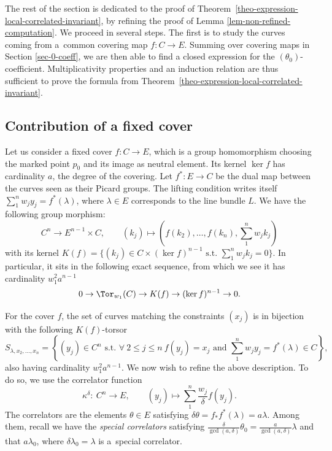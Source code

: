 The rest of the section is dedicated to the proof of Theorem~\ref{theo-expression-local-correlated-invariant}, by refining the proof of Lemma \ref{lem-non-refined-computation}. We proceed in several steps. The first is to study the curves coming from a~common covering map $f\colon C\to E$. Summing over covering maps in Section \ref{sec-0-coeff}, we are then able to find a closed expression for the $(\theta_0)$-coefficient. Multiplicativity properties and an induction relation are thus sufficient to prove the formula from Theorem~\ref{theo-expression-local-correlated-invariant}.

 \subsection{Contribution of a fixed cover}

 Let us consider a fixed cover $f\colon C\to E$, which is a group homomorphism choosing the marked point $p_0$ and its image as neutral element. Its kernel $\ker f$ has cardinality $a$, the degree of the covering. Let $f^*\colon E\to C$ be the dual map between the curves seen as their Picard groups. The lifting condition writes itself $\sum_1^n w_jy_j=f^*(\lambda)$, where $\lambda\in E$ corresponds to the line bundle $L$. We have the following group morphism:
 \[
 C^n \longrightarrow E^{n-1}\times C, \qquad
 (k_j) \longmapsto \left(f(k_2),\dots,f(k_n),\sum_1^n w_jk_j \right)
 \]
 with its kernel $K(f)=\big\{ (k_j)\in C\times(\ker f)^{n-1} \text{ s.t. } \sum_1^n w_jk_j=0 \big\}$. In particular, it sits in the following exact sequence, from which we see it has cardinality $w_1^2 a^{n-1}$
 \[ 0\to \Tor_{w_1}(C) \to K(f) \to (\ker f)^{n-1} \to 0. \]

 For the cover $f$, the set of curves matching the constraints $(x_j)$ is in bijection with the following $K(f)$-torsor
 \[ S_{\lambda,x_2,\dots,x_n}=\left\{ (y_j)\in C^n \text{ s.t. }\forall \ 2\leqslant j\leqslant n \ f(y_j)=x_j \text{ and }\sum_1^n w_jy_j=f^*(\lambda)\in C\right\}, \]
also having cardinality $w_1^2a^{n-1}$. We now wish to refine the above description. To do so, we use the correlator function
 \[
 \kappa^\delta \colon\ C^n \longrightarrow E,\qquad
 (y_j) \longmapsto \sum_1^n \frac{w_j}{\delta}f(y_j).
 \]
 The correlators are the elements $\theta\in E$ satisfying $\delta\theta=f_*f^*(\lambda)=a\lambda$. Among them, recall we have the \textit{special correlators} satisfying $\frac{\delta}{\gcd(a,\delta)}\theta_0=\frac{a}{\gcd(a,\delta)}\lambda$ and that $a\lambda_0$, where $\delta\lambda_0=\lambda$ is a~special correlator.


